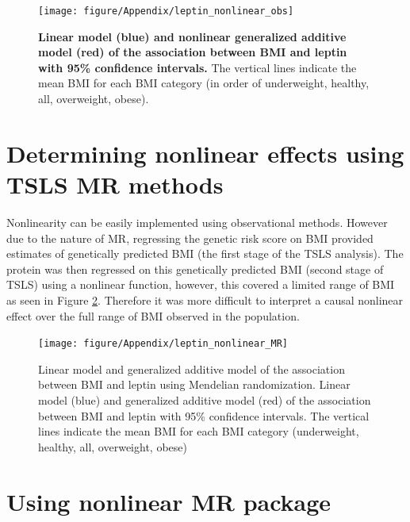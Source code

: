 \documentclass[11pt,twoside]{bristolthesis}
\begin{document}
\begin{figure}

{\centering \texttt{[image: figure/Appendix/leptin\_nonlinear\_obs]} 

}

\caption[Linear model and generalized additive model of the association between BMI and leptin]{\textbf{Linear model (blue) and nonlinear generalized additive model (red) of the association between BMI and leptin with 95\% confidence intervals.} The vertical lines indicate the mean BMI for each BMI category (in order of underweight, healthy, all, overweight, obese).}\label{fig:leptin-lm-GAM}
\end{figure}
\hypertarget{determining-nonlinear-effects-using-tsls-mr-methods}{%
\section{Determining nonlinear effects using TSLS MR methods}\label{determining-nonlinear-effects-using-tsls-mr-methods}}

Nonlinearity can be easily implemented using observational methods. However due to the nature of MR, regressing the genetic risk score on BMI provided estimates of genetically predicted BMI (the first stage of the TSLS analysis). The protein was then regressed on this genetically predicted BMI (second stage of TSLS) using a nonlinear function, however, this covered a limited range of BMI as seen in Figure \ref{fig:leptin-lm-GAM-MR}. Therefore it was more difficult to interpret a causal nonlinear effect over the full range of BMI observed in the population.



\begin{figure}

{\centering \texttt{[image: figure/Appendix/leptin\_nonlinear\_MR]} 

}

\caption[Linear model and generalized additive model of the association between BMI and leptin using Mendelian randomization]{Linear model and generalized additive model of the association between BMI and leptin using Mendelian randomization. Linear model (blue) and generalized additive model (red) of the association between BMI and leptin with 95\% confidence intervals. The vertical lines indicate the mean BMI for each BMI category (underweight, healthy, all, overweight, obese)}\label{fig:leptin-lm-GAM-MR}
\end{figure}
\hypertarget{using-nonlinear-mr-package}{%
\section{Using nonlinear MR package}\label{using-nonlinear-mr-package}}
\end{document}

